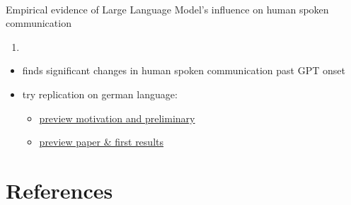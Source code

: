 \documentclass[
  letterpaper,
  DIV=11,
  numbers=noendperiod]{scrartcl}
\makeatletter
\let\oldparagraph\paragraph
\renewcommand{\paragraph}{
    \@ifstar
      \xxxParagraphStar
      \xxxParagraphNoStar
  }
\newcommand{\xxxParagraphStar}[1]{\oldparagraph*{#1}\mbox{}}
\newcommand{\xxxParagraphNoStar}[1]{\oldparagraph{#1}\mbox{}}
\providecommand{\tightlist}{%
  \setlength{\itemsep}{0pt}\setlength{\parskip}{0pt}}
\makeatother
\begin{document}
\paragraph{Empirical evidence of Large Language Model's influence on
human spoken
communication}\label{empirical-evidence-of-large-language-models-influence-on-human-spoken-communication}

\begin{enumerate}
\def\labelenumi{(\arabic{enumi})}
\setcounter{enumi}{1}
\tightlist
\item
\end{enumerate}

\begin{itemize}
\tightlist
\item
  finds significant changes in human spoken communication past GPT onset
\item
  try replication on german language:

  \begin{itemize}
  \tightlist
  \item
    \href{yakura.html}{preview motivation and preliminary}
  \item
    \href{gemini.html}{preview paper \& first results}
  \end{itemize}
\end{itemize}

\section*{References}\label{references}
\end{document}
